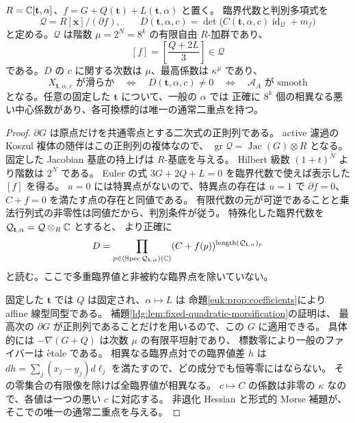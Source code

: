 \begin{corollary}
\label{euk:cor:discriminant}
$R=\mathbb C[\mathbf t,\alpha]$、$f=G+Q(\mathbf t)+L(\mathbf t,\alpha)$ と置く。
臨界代数と判別多項式を
\[
 \mathcal Q=R[\mathbf x]/(\partial f),\qquad
 D(\mathbf t,\alpha,c)
   =\det\bigl(C(\mathbf t,\alpha,c)\operatorname{id}_{\mathcal Q}+m_f\bigr)
\]
と定める。$\mathcal Q$ は階数 $\mu=2^N=8^k$ の有限自由 $R$-加群であり、
\[
                    [f]=\left[\frac{Q+2L}{3}\right]\in\mathcal Q
\]
である。$D$ の $c$ に関する次数は $\mu$、最高係数は $\kappa^\mu$ であり、
\[
 X_{\mathbf t,\alpha,c}\text{ が滑らか}
    \quad\Longleftrightarrow\quad D(\mathbf t,\alpha,c)\ne0
    \quad\Longleftrightarrow\quad\mathcal A_A\text{ が smooth}
\]
となる。任意の固定した $\mathbf t$ について、一般の $\alpha$ では
正確に $8^k$ 個の相異なる悪い中心係数があり、各可換標的は唯一の通常二重点を持つ。
\end{corollary}

\begin{proof}
$\partial G$ は原点だけを共通零点とする二次式の正則列である。
active 濾過の Koszul 複体の随伴はこの正則列の複体なので、
$\operatorname{gr}\mathcal Q=\operatorname{Jac}(G)\otimes R$ となる。
固定した Jacobian 基底の持上げは $R$-基底を与える。
Hilbert 級数 $(1+t)^N$ より階数は $2^N$ である。
Euler の式 $3G+2Q+L=0$ を臨界代数で使えば表示した $[f]$ を得る。
$u=0$ には特異点がないので、特異点の存在は $u=1$ で
$\partial f=0$、$C+f=0$ を満たす点の存在と同値である。
有限代数の元が可逆であることと乗法行列式の非零性は同値だから、判別条件が従う。
特殊化した臨界代数を $\mathcal Q_{\mathbf t,\alpha}=\mathcal Q\otimes_R\mathbb C$ とすると、
より正確に
\[
 D=\prod_{p\in(\operatorname{Spec}\mathcal Q_{\mathbf t,\alpha})(\mathbb C)}
                  (C+f(p))^{\operatorname{length}(\mathcal Q_{\mathbf t,\alpha})_p}
\]
と読む。ここで多重臨界値と非被約な臨界点を除いていない。

固定した $\mathbf t$ では $Q$ は固定され、$\alpha\mapsto L$ は
命題\ref{euk:prop:coefficients}により affine 線型同型である。
補題\ref{ldg:lem:fixed-quadratic-morsification}の証明は、
最高次の $\partial G$ が正則列であることだけを用いるので、この $G$ に適用できる。
具体的には $-\nabla(G+Q)$ は次数 $\mu$ の有限平坦射であり、
標数零により一般のファイバーは \`etale である。
相異なる臨界点対での臨界値差 $h$ は
$dh=\sum_j(x_j-y_j)d\ell_j$ を満たすので、どの成分でも恒等零にはならない。
その零集合の有限像を除けば全臨界値が相異なる。
$c\mapsto C$ の係数は非零の $\kappa$ なので、各値は一つの悪い $c$ に対応する。
非退化 Hessian と形式的 Morse 補題が、そこでの唯一の通常二重点を与える。
\end{proof}

